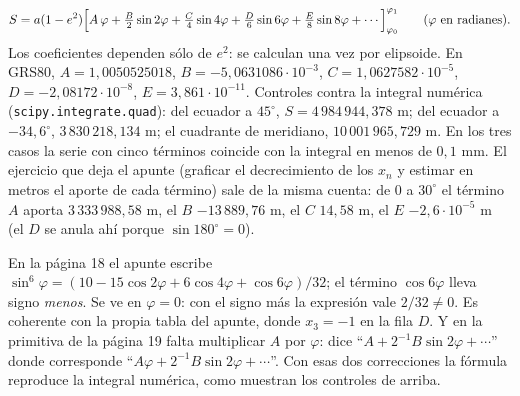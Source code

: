 \begin{resultado}
\[
  S=a(1-e^2)\Bigl[A\,\varphi+\tfrac B2\sin2\varphi+\tfrac C4\sin4\varphi
  +\tfrac D6\sin6\varphi+\tfrac E8\sin8\varphi+\cdots\Bigr]_{\varphi_0}^{\varphi_1}
  \qquad(\varphi\ \text{en radianes}).
\]
Los coeficientes dependen sólo de \(e^2\): se calculan una vez por elipsoide. En GRS80,
\(A=1{,}0050525018\), \(B=-5{,}0631086\cdot10^{-3}\), \(C=1{,}0627582\cdot10^{-5}\),
\(D=-2{,}08172\cdot10^{-8}\), \(E=3{,}861\cdot10^{-11}\). Controles contra la integral
numérica (\texttt{scipy.integrate.quad}): del ecuador a \(45^\circ\),
\(S=4\,984\,944{,}378\) m; del ecuador a \(-34{,}6^\circ\), \(3\,830\,218{,}134\) m; el
cuadrante de meridiano, \(10\,001\,965{,}729\) m. En los tres casos la serie con cinco
términos coincide con la integral en menos de \(0{,}1\) mm. El ejercicio que deja el
apunte (graficar el decrecimiento de los \(x_n\) y estimar en metros el aporte de cada
término) sale de la misma cuenta: de \(0\) a \(30^\circ\) el término \(A\) aporta
\(3\,333\,988{,}58\) m, el \(B\) \(-13\,889{,}76\) m, el \(C\) \(14{,}58\) m, el \(E\)
\(-2{,}6\cdot10^{-5}\) m (el \(D\) se anula ahí porque \(\sin180^\circ=0\)).
\end{resultado}

\begin{atencion}
En la página 18 el apunte escribe
\(\sin^6\varphi=(10-15\cos2\varphi+6\cos4\varphi+\cos6\varphi)/32\); el término
\(\cos6\varphi\) lleva signo \emph{menos}. Se ve en \(\varphi=0\): con el signo más la
expresión vale \(2/32\neq0\). Es coherente con la propia tabla del apunte, donde
\(x_3=-1\) en la fila \(D\). Y en la primitiva de la página 19 falta multiplicar \(A\) por
\(\varphi\): dice ``\(A+2^{-1}B\sin2\varphi+\cdots\)'' donde corresponde
``\(A\varphi+2^{-1}B\sin2\varphi+\cdots\)''. Con esas dos correcciones la fórmula reproduce
la integral numérica, como muestran los controles de arriba.
\end{atencion}

